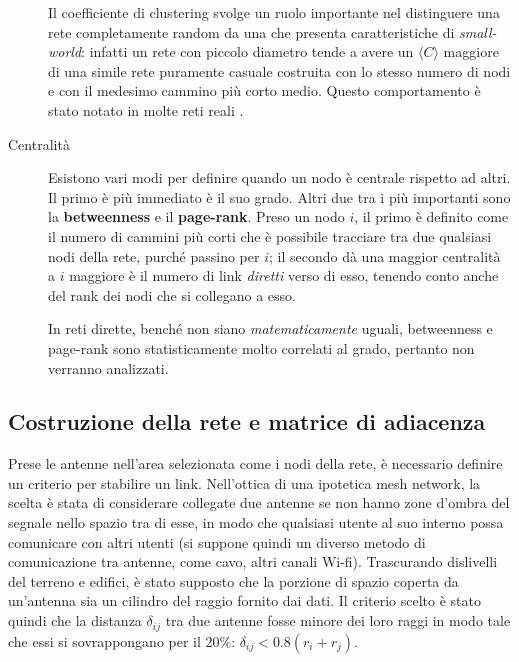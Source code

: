 \begin{description}
	Il coefficiente di clustering svolge un ruolo importante nel distinguere una rete completamente random da una che presenta caratteristiche di \emph{small-world}: infatti un rete con piccolo diametro tende a avere un $\langle C\rangle$ maggiore di una simile rete puramente casuale costruita con lo stesso numero di nodi e con il medesimo cammino più corto medio. Questo comportamento è stato notato in molte reti reali \parencite{Watts1998}.
	\item[Centralit\`a] Esistono vari modi per definire quando un nodo è centrale rispetto ad altri. Il primo è più immediato è il suo grado. Altri due tra i più importanti sono la \textbf{betweenness} e il \textbf{page-rank}. Preso un nodo $i$, il primo è definito come il numero di cammini più corti che è possibile tracciare tra due qualsiasi nodi della rete, purché passino per $i$; il secondo dà una maggior centralità a $i$ maggiore è il numero di link \emph{diretti} verso di esso, tenendo conto anche del rank dei nodi che si collegano a esso. 
	
	In reti dirette, benché non siano \emph{matematicamente} uguali, betweenness e page-rank sono statisticamente molto correlati al grado, pertanto non verranno analizzati. 
\end{description}

\subsection{Costruzione della rete e matrice di adiacenza}
Prese le antenne nell'area selezionata come i nodi della rete, è necessario definire un criterio per stabilire un link. Nell'ottica di una ipotetica mesh network, la scelta è stata di considerare collegate due antenne se non hanno zone d'ombra del segnale nello spazio tra di esse, in modo che qualsiasi utente al suo interno possa comunicare con altri utenti (si suppone quindi un diverso metodo di comunicazione tra antenne, come cavo, altri canali Wi-fi). Trascurando dislivelli del terreno e edifici, è stato supposto che la porzione di spazio coperta da un'antenna sia un cilindro del raggio fornito dai dati. Il criterio scelto è stato quindi che la distanza $\delta_{ij}$ tra due antenne fosse minore dei loro raggi in modo tale che essi si sovrappongano per il $20\%$: $\delta_{ij} < 0.8(r_i+r_j)$.


